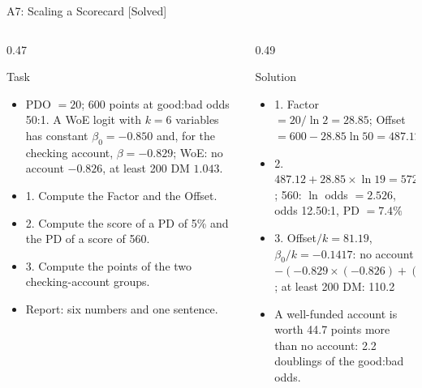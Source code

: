 \begin{frame}{A7: Scaling a Scorecard [Solved]}
\itemsize{\scriptsize}
\begin{columns}[T]
\begin{column}{0.47\textwidth}
\begin{block}{Task}
\begin{itemize}
    \item PDO $= 20$; 600 points at good:bad odds 50:1. A WoE logit with $k = 6$ variables has constant $\beta_0 = -0.850$ and, for the checking account, $\beta = -0.829$; WoE: no account $-0.826$, at least 200 DM $1.043$.
    \item 1. Compute the Factor and the Offset.
    \item 2. Compute the score of a PD of 5\% and the PD of a score of 560.
    \item 3. Compute the points of the two checking-account groups.
    \item Report: six numbers and one sentence.
\end{itemize}
\end{block}
\end{column}
\begin{column}{0.49\textwidth}
\begin{exampleblock}{Solution}
\begin{itemize}
    \item 1. Factor $= 20/\ln 2 = 28.85$; Offset $= 600 - 28.85\ln 50 = 487.12$
    \item 2. $487.12 + 28.85 \times \ln 19 = 572.08$; 560: $\ln$ odds $= 2.526$, odds 12.50:1, PD $= 7.4\%$
    \item 3. Offset$/k = 81.19$, $\beta_0/k = -0.1417$: no account $-(-0.829 \times (-0.826) + (-0.1417)) \times 28.85 + 81.19 = 65.5$; at least 200 DM: 110.2
    \item A well-funded account is worth 44.7 points more than no account: 2.2 doublings of the good:bad odds.
\end{itemize}
\end{exampleblock}
\end{column}
\end{columns}
\end{frame}

